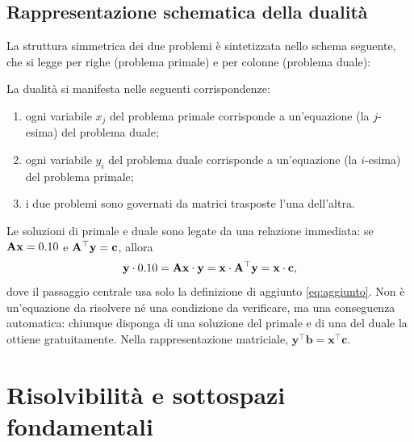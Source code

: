 \subsection{Rappresentazione schematica della dualit\`a}

La struttura simmetrica dei due problemi \`e sintetizzata nello schema seguente, che si legge per righe (problema primale) e per colonne (problema duale):





\noindent La dualit\`a si manifesta nelle seguenti corrispondenze:
\begin{enumerate}[label=(\roman*)]
	\item ogni variabile $x_j$ del problema primale corrisponde a un'equazione (la $j$-esima) del problema duale;
	\item ogni variabile $y_i$ del problema duale corrisponde a un'equazione (la $i$-esima) del problema primale;
	\item i due problemi sono governati da matrici trasposte l'una dell'altra.
\end{enumerate}


\begin{oss}
	Le soluzioni di primale e duale sono legate da una relazione immediata: se $\mathbf{A}\mathbf{x}=0.10$ e $\mathbf{A}^\top\mathbf{y}=\mathbf{c}$, allora
	\begin{equation}\label{eq:id_bil}
		\mathbf{y}\cdot0.10=\mathbf{A}\mathbf{x}\cdot\mathbf{y}=\mathbf{x}\cdot\mathbf{A}^\top\mathbf{y}=\mathbf{x}\cdot\mathbf{c},
	\end{equation}
	dove il passaggio centrale usa solo la definizione di aggiunto \eqref{eq:aggiunto}. Non è un'equazione da risolvere né una condizione da verificare, ma una conseguenza automatica: chiunque disponga di una soluzione del primale e di una del duale la ottiene gratuitamente. Nella rappresentazione matriciale, $\bm{y}^\top\bm{b}=\bm{x}^\top\bm{c}$. 
\end{oss}






\section{Risolvibilità e sottospazi fondamentali}	\label{sec:risolvibilita_duale}

